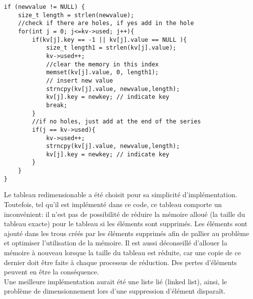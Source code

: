 \documentclass[11pt,a4paper]{article}
\begin{document}
\begin{lstlisting}
if (newvalue != NULL) {
	size_t length = strlen(newvalue);
	//check if there are holes, if yes add in the hole
	for(int j = 0; j<=kv->used; j++){
		if(kv[j].key == -1 || kv[j].value == NULL ){
			size_t length1 = strlen(kv[j].value);
			kv->used++;
			//clear the memory in this index
			memset(kv[j].value, 0, length1); 
			// insert new value
			strncpy(kv[j].value, newvalue,length); 
			kv[j].key = newkey; // indicate key
			break;
		}
		//if no holes, just add at the end of the series
		if(j == kv->used){
			kv->used++;
			strncpy(kv[j].value, newvalue,length); 
			kv[j].key = newkey; // indicate key
		}
	}
}
\end{lstlisting}

Le tableau redimensionable a été choisit pour sa simplicité d'implémentation. Toutefois, tel qu'il est implémenté dans ce code, ce tableau comporte un inconvénient: il n'est pas de possibilité de réduire la mémoire alloué (la taille du tableau exacte) pour le tableau si les éléments sont supprimés. Les éléments sont ajouté dans les trous créés par les éléments supprimés afin de pallier au problème et optimiser l'utilisation de la mémoire. Il est aussi déconseillé d'allouer la mémoire à nouveau lorsque la taille du tableau est réduite, car une copie de ce dernier doit être faite à chaque processus de réduction. Des pertes d'éléments peuvent en être la conséquence.\\
Une meilleure implémentation aurait été une liste lié (linked list), ainsi, le problème de dimensionnement lors d'une suppression d'élément disparaît.
\end{document}
